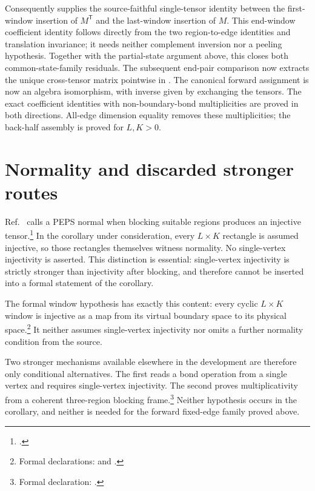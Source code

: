 \documentclass{article}
\begin{document}
Consequently
supplies the source-faithful single-tensor identity between the first-window insertion of
$M^{\mathsf T}$ and the last-window insertion of $M$.  This end-window
coefficient identity follows directly from the two region-to-edge identities
and translation invariance; it needs neither complement inversion nor a
peeling hypothesis.  Together with the partial-state argument above, this
closes both common-state-family residuals.  The subsequent end-pair comparison
now extracts the unique cross-tensor matrix pointwise in
.
The canonical forward assignment is now an algebra isomorphism, with
inverse given by exchanging the tensors. The exact coefficient identities
with non-boundary-bond multiplicities are proved in both directions.
All-edge dimension equality removes these multiplicities; the back-half
assembly is proved for $L,K>0$.

\section{Normality and discarded stronger routes}

Ref.~\cite{Molnar2018NormalPEPS} calls a PEPS normal when blocking
suitable regions produces an injective tensor.\footnote{.}
In the corollary under consideration, every $L\times K$ rectangle is assumed
injective, so those rectangles themselves witness normality.  No
single-vertex injectivity is asserted.  This distinction is essential:
single-vertex injectivity is strictly stronger than injectivity after
blocking, and therefore cannot be inserted into a formal statement of the
corollary.

The formal window hypothesis has exactly this content: every cyclic
$L\times K$ window is injective as a map from its virtual boundary space to
its physical space.\footnote{Formal declarations:
     and
    .}  It neither assumes
single-vertex injectivity nor omits a further normality condition from the
source.

Two stronger mechanisms available elsewhere in the development are therefore
only conditional alternatives.  The first reads a bond operation from a
single vertex and requires single-vertex injectivity.  The second proves
multiplicativity from a coherent three-region blocking frame.\footnote{Formal
    declaration:
    .}  Neither
hypothesis occurs in the corollary, and neither is needed for the forward
fixed-edge family proved above.
\end{document}
